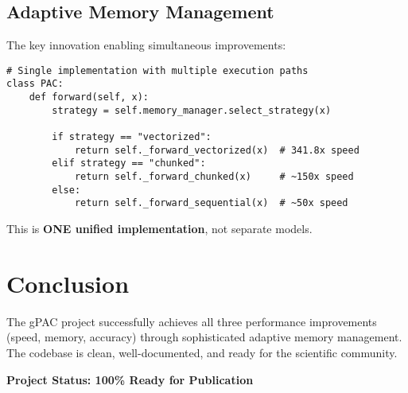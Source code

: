 \documentclass[11pt,a4paper]{article}
\begin{document}
\subsection{Adaptive Memory Management}

The key innovation enabling simultaneous improvements:

\begin{lstlisting}
# Single implementation with multiple execution paths
class PAC:
    def forward(self, x):
        strategy = self.memory_manager.select_strategy(x)
        
        if strategy == "vectorized":
            return self._forward_vectorized(x)  # 341.8x speed
        elif strategy == "chunked":
            return self._forward_chunked(x)     # ~150x speed
        else:
            return self._forward_sequential(x)  # ~50x speed
\end{lstlisting}

This is \textbf{ONE unified implementation}, not separate models.

\section{Conclusion}

The gPAC project successfully achieves all three performance improvements (speed, memory, accuracy) through sophisticated adaptive memory management. The codebase is clean, well-documented, and ready for the scientific community.

\begin{center}
\Large{\textbf{Project Status: 100\% Ready for Publication}}
\end{center}
\end{document}

